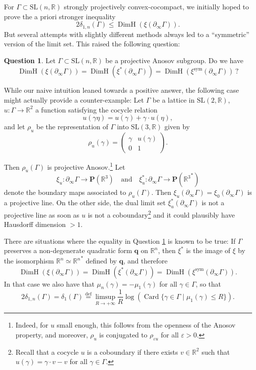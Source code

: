 \documentclass[JEP,XML,SOM,Unicode,NoEqCountersInSection,NoFloatCountersInSection,published]{cedram}
\newcommand{\quand}{\quad\text{and}\quad}
\newcommand{\sym}{\mathrm{sym}}
\theoremstyle{definition}
\newtheorem{question}[theo]{Question}
\newcommand{\proj}{\mathbf{P}}
\newcommand{\R}{\mathbb{R}}
\newcommand{\SL}{\mathrm{SL}}
\DeclareMathOperator{\Card}{Card}
\DeclareMathOperator{\DimH}{DimH}
\let\epsilon\varepsilon
\let\G\Gamma
\begin{document}
For $\Gamma\subset \SL(n,\R)$ strongly projectively convex-cocompact, we initially hoped to prove the a priori stronger inequality
\[2 \delta_{1,n}(\Gamma) \leq \DimH(\xi(\partial_\infty \G)).\] But several attempts with slightly different methods always led to a ``symmetric'' version of the limit set. This raised the following question:
\begin{question} \label{ques-HaudorffDimensionSymmetric}
Let $\G \subset \SL(n,\R)$ be a projective Anosov subgroup. Do we have
\[\DimH(\xi(\partial_\infty \G)) = \DimH(\xi^*(\partial_\infty \G)) = \DimH(\xi^{\sym}(\partial_\infty \G))~?\]
\end{question}
While our naive intuition leaned towards a positive answer, the following case might actually provide a counter-example: Let $\Gamma$ be a lattice in $\SL(2,\R)$, $u:\G \to \R^2$ a function satisfying the cocycle relation
\[u(\gamma \eta) = u(\gamma) + \gamma \cdot u(\eta),\]
and let $\rho_u$ be the representation of $\Gamma$ into $\SL(3,\R)$ given by
\[\rho_u(\gamma) = \left( \begin{matrix} \gamma & u(\gamma) \\ 0 & 1\end{matrix} \right).\]

Then $\rho_u(\G)$ is projective Anosov.\footnote{Indeed, for $u$ small enough, this follows from the openness of the Anosov property, and moreover, $\rho_u$ is conjugated to $\rho_{\epsilon u}$ for all $\epsilon>0$.} Let
\[
\xi_u: \partial_\infty \G \to \proj(\R^3)\quand \xi_u^*: \partial_\infty \G \to \proj({\R^3}^*)
\]
denote the boundary maps associated to $\rho_u(\G)$. Then $\xi_u(\partial_\infty\G) = \xi_0(\partial_\infty \G)$ is a projective line. On the other side, the dual limit set $\xi_u^*(\partial_\infty \G)$ is not a projective line as soon as $u$ is not a coboundary\footnote{Recall that a cocycle $u$ is a coboundary if there exists $v\in \R^2$ such that $u(\gamma) = \gamma \cdot v - v$ for all $\gamma \in \G$.} and it could plausibly have Hausdorff dimension $>1$.

There are situations where the equality in Question \ref{ques-HaudorffDimensionSymmetric} is known to be true: If $\G$ preserves a non-degenerate quadratic form $\boldsymbol{q}$ on $\R^n$, then $\xi^*$ is the image of $\xi$ by the isomorphism $\R^n\simeq {\R^n}^*$ defined by $\boldsymbol{q}$, and therefore
\[\DimH(\xi(\partial_\infty \G)) = \DimH(\xi^*(\partial_\infty \G)) = \DimH(\xi^{\sym}(\partial_\infty \G)).\]
In that case we also have that $\mu_n(\gamma) = - \mu_1(\gamma)$ for all $\gamma \in \G$, so that
\[2\delta_{1,n}(\G) = \delta_1(\G) \overset{\textrm{def}}{=} \limsup_{R\to +\infty} \frac{1}{R} \log \left(\Card \{\gamma \in \G \mid \mu_1(\gamma) \leq R\}\right).\]
\end{document}
